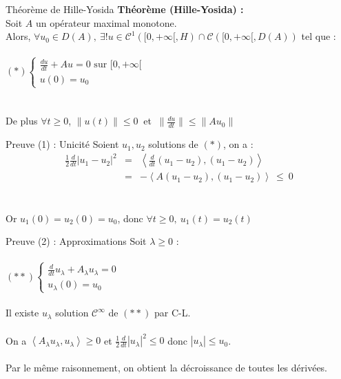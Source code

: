\documentclass[10pt]{beamer}
\begin{document}
\begin{frame}{Théorème de Hille-Yosida}
\textbf{Théorème (Hille-Yosida) : \\}
Soit $A$ un opérateur maximal monotone.\\
 Alors, $\forall u_0 \in D(A), \ \exists ! u \in \mathcal{C}^1([0,+\infty[,H) \cap\mathcal{C}([0,+\infty[,D(A)) $ tel que : \\ ~ \\
$(*) \begin{cases}\displaystyle \frac{du}{dt} +Au = 0 \text{\ \ \ \ sur } [0,+\infty[ \\ u(0)=u_0 \end{cases}$ \\ ~ \\ ~ \\
De plus  $\forall t \geq 0$, $\|u(t)\|\leq 0 \ $ et $\ \displaystyle \|\frac{du}{dt}\| \leq  \|Au_0\|$
\end{frame}


\begin{frame}{Preuve (1) : Unicité}
Soient $u_1,u_2$ solutions de $(*)$, on a : 
\begin{eqnarray*}  \frac{1}{2}\frac{d}{dt}|u_1-u_2|^2  &=& \left< \frac{d}{dt}(u_1-u_2),(u_1-u_2)\right> \\
&=&-\left< A(u_1-u_2),(u_1-u_2)\right> \ \leq \ 0
\end{eqnarray*}
\\ ~ \\
Or $u_1(0)=u_2(0)=u_0$, donc $ \forall t \geq 0, \ u_1(t)=u_2(t)$
\end{frame}


\begin{frame}{Preuve (2) : Approximations}
Soit $\lambda \geq 0$ : \\ ~ \\
$(**) \begin{cases}\displaystyle \frac{d}{dt}u_\lambda +A_\lambda u_\lambda = 0 \\ u_\lambda(0)=u_0 \end{cases}$ \\ ~ \\ 
Il existe $u_\lambda$ solution $\mathcal{C}^\infty$ de $(**)$ par C-L. \\ ~ \\ 
On a $\left< A_\lambda u_\lambda,u_\lambda\right> \geq 0$ et $\frac{1}{2}\frac{d}{dt}|u_\lambda|^2 \leq 0$ donc $|u_\lambda|\leq u_0$. \\ ~ \\
Par le même raisonnement, on obtient la décroissance de toutes les dérivées.
\end{frame}
\end{document}
